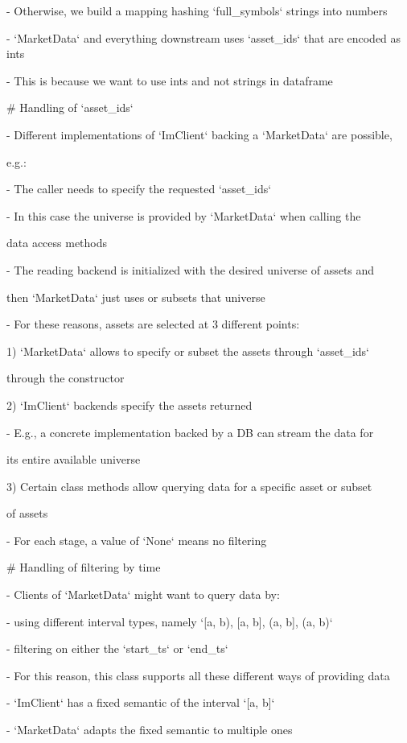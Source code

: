 \documentclass[11pt, reqno]{amsart}
\begin{document}
- Otherwise, we build a mapping hashing `full\_symbols` strings into
numbers

- `MarketData` and everything downstream uses `asset\_ids` that are
encoded as ints

- This is because we want to use ints and not strings in dataframe

\# Handling of `asset\_ids`

- Different implementations of `ImClient` backing a `MarketData` are
possible,

e.g.:

- The caller needs to specify the requested `asset\_ids`

- In this case the universe is provided by `MarketData` when calling the

data access methods

- The reading backend is initialized with the desired universe of assets
and

then `MarketData` just uses or subsets that universe

- For these reasons, assets are selected at 3 different points:

1) `MarketData` allows to specify or subset the assets through
`asset\_ids`

through the constructor

2) `ImClient` backends specify the assets returned

- E.g., a concrete implementation backed by a DB can stream the data for

its entire available universe

3) Certain class methods allow querying data for a specific asset or
subset

of assets

- For each stage, a value of `None` means no filtering

\# Handling of filtering by time

- Clients of `MarketData` might want to query data by:

- using different interval types, namely `{[}a, b), {[}a, b{]}, (a,
b{]}, (a, b)`

- filtering on either the `start\_ts` or `end\_ts`

- For this reason, this class supports all these different ways of
providing data

- `ImClient` has a fixed semantic of the interval `{[}a, b{]}`

- `MarketData` adapts the fixed semantic to multiple ones
\end{document}
